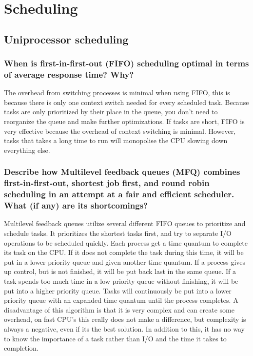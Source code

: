 \documentclass[a4paper]{article}
\begin{document}
\section{Scheduling }


\subsection{Uniprocessor scheduling}

\subsubsection{When is first-in-first-out (FIFO) scheduling optimal in terms of average response time? Why?}

The overhead from switching processes is minimal when using FIFO, this is because there is only one context switch needed for every scheduled task. Because tasks are only prioritized by their place in the queue, you don't need to reorganize the queue and make further optimizations. If tasks are short, FIFO is very effective because the overhead of context switching is minimal. However, tasks that takes a long time to run will monopolise the CPU slowing down everything else.
 
\subsubsection{Describe how Multilevel feedback queues (MFQ) combines first-in-first-out, shortest job first, and
round robin scheduling in an attempt at a fair and efficient scheduler. What (if any) are its
shortcomings?}

Multilevel feedback queues utilize several different FIFO queues to prioritize and schedule tasks. It prioritizes the shortest tasks first, and try to separate I/O operations to be scheduled quickly. Each process get a time quantum to complete its task on the CPU. If it does not complete the task during this time, it will be put in a lower priority queue and given another time quantum. If a process gives up control, but is not finished, it will be put back last in the same queue. If a task spends too much time in a low priority queue without finishing, it will be put into a higher priority queue. Tasks will continuously be put into a lower priority queue with an expanded time quantum until the process completes. A disadvantage of this algorithm is that it is very complex and can create some overhead, on fast CPU's this really does not make a difference, but complexity is always a negative, even if its the best solution. In addition to this, it has no way to know the importance of a task rather than I/O and the time it takes to completion.
\end{document}
